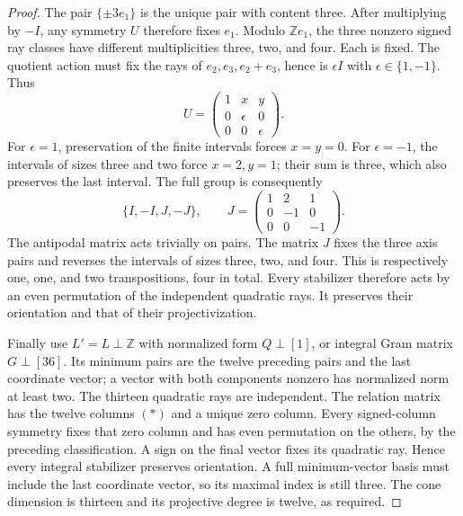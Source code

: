 \begin{proof}
The pair $\{\pm3e_1\}$ is the unique pair with content three.
After multiplying by $-I$, any symmetry $U$ therefore fixes $e_1$.
Modulo $\mathbb Ze_1$, the three nonzero signed ray classes have
different multiplicities three, two, and four. Each is fixed.
The quotient action must fix the rays of $e_2,e_3,e_2+e_3$, hence is
$\epsilon I$ with $\epsilon\in\{1,-1\}$. Thus
\[
 U=\begin{pmatrix}1&x&y\\0&\epsilon&0\\0&0&\epsilon\end{pmatrix}.
\]
For $\epsilon=1$, preservation of the finite intervals forces $x=y=0$.
For $\epsilon=-1$, the intervals of sizes three and two force
$x=2,y=1$; their sum is three, which also preserves the last interval.
The full group is consequently
\[
 \{I,-I,J,-J\},\qquad
 J=\begin{pmatrix}1&2&1\\0&-1&0\\0&0&-1\end{pmatrix}.
\]
The antipodal matrix acts trivially on pairs. The matrix $J$ fixes the
three axis pairs and reverses the intervals of sizes three, two, and
four. This is respectively one, one, and two transpositions, four
in total. Every stabilizer therefore acts by an even permutation of
the independent quadratic rays. It preserves their orientation and
that of their projectivization.

Finally use $L'=L\perp\mathbb Z$ with normalized form $Q\perp[1]$,
or integral Gram matrix $G\perp[36]$. Its minimum pairs are the
twelve preceding pairs and the last coordinate vector; a vector
with both components nonzero has normalized norm at least two.
The thirteen quadratic rays are independent. The relation matrix
has the twelve columns $(\ast)$ and a unique zero column.
Every signed-column symmetry fixes that zero column and has even
permutation on the others, by the preceding classification. A sign
on the final vector fixes its quadratic ray. Hence every integral
stabilizer preserves orientation. A full minimum-vector basis must
include the last coordinate vector, so its maximal index is still
three. The cone dimension is thirteen and its projective degree is
twelve, as required.
\end{proof}

